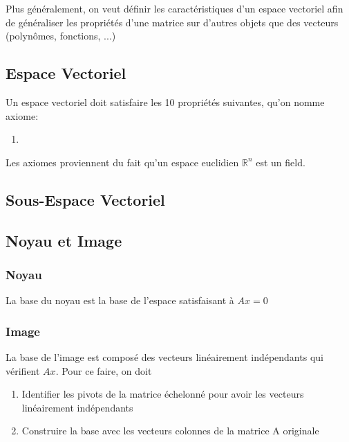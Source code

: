 \documentclass{article}
\begin{document}
Plus généralement, on veut définir les caractéristiques d'un espace vectoriel
afin de généraliser les propriétés d'une matrice sur d'autres objets que
des vecteurs (polynômes, fonctions, ...)

\subsection{Espace Vectoriel}%
\label{sub:Espace Vectoriel}

\begin{definition}
    Un espace vectoriel doit satisfaire les 10 propriétés suivantes, qu'on
    nomme axiome:
    \begin{enumerate}
	\item
    \end{enumerate}
\end{definition}

\begin{remark}
    Les axiomes proviennent du fait qu'un espace euclidien $\mathbb{R}^n$
    est un field.
\end{remark}

\subsection{Sous-Espace Vectoriel}%
\label{sub:Sous-Espace Vectoriel}

\begin{definition}
\end{definition}

\subsection{Noyau et Image}%
\label{sub:Noyau et Image}

\subsubsection{Noyau}%
\label{ssub:Noyau}

La base du noyau est la base de l'espace satisfaisant à $ Ax=0$

\subsubsection{Image}%
\label{ssub:Image}

La base de l'image est composé des vecteurs linéairement indépendants qui
vérifient $Ax$. Pour ce faire, on doit
\begin{enumerate}
    \item Identifier les pivots de la matrice échelonné pour avoir les
	vecteurs linéairement indépendants
    \item Construire la base avec les vecteurs colonnes de la matrice A
	originale
\end{enumerate}
\end{document}
